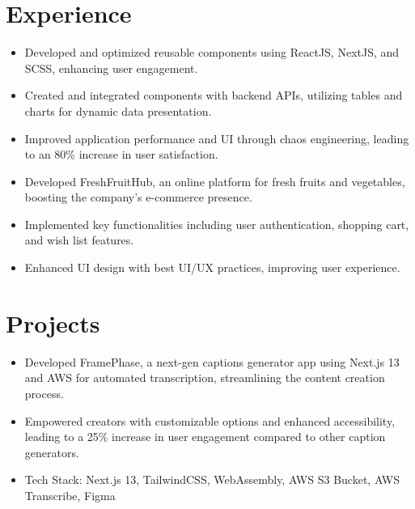 \documentclass[11pt,a4paper,sans]{moderncv}
\begin{document}
\section{Experience}
{
\begin{itemize}[leftmargin=0.6cm, label={\textbullet}]
    \item Developed and optimized reusable components using ReactJS, NextJS, and SCSS, enhancing user engagement.
    \item Created and integrated components with backend APIs, utilizing tables and charts for dynamic data presentation.
    \item Improved application performance and UI through chaos engineering, leading to an 80\% increase in user satisfaction.
\end{itemize}
}

{
\begin{itemize}[leftmargin=0.6cm, label={\textbullet}]
    \item Developed FreshFruitHub, an online platform for fresh fruits and vegetables, boosting the company's e-commerce presence.
    \item Implemented key functionalities including user authentication, shopping cart, and wish list features.
    \item Enhanced UI design with best UI/UX practices, improving user experience.
\end{itemize}
}

\section{Projects}
{
\begin{itemize}[leftmargin=0.6cm, label={\textbullet}]
    \item Developed FramePhase, a next-gen captions generator app using Next.js 13 and AWS for automated transcription, streamlining the content creation process.
    \item Empowered creators with customizable options and enhanced accessibility, leading to a 25\% increase in user engagement compared to other caption generators.
    \item Tech Stack: Next.js 13, TailwindCSS, WebAssembly, AWS S3 Bucket, AWS Transcribe, Figma
\end{itemize}
}
\end{document}
